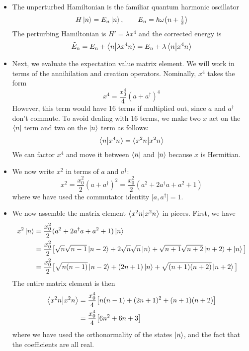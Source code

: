 \documentclass[11pt, a4paper]{article}
\renewcommand{\t}[1]{\tilde{#1}}
\begin{document}
\begin{itemize}
	
	\item The unperturbed Hamiltonian is the familiar quantum harmonic oscillator
	\begin{equation*}
		H \ket{n} = E_{n} \ket{n}, \qquad E_{n} = \hbar \omega \big(n + \tfrac{1}{2}\big)
	\end{equation*}
	The perturbing Hamiltonian is $ H' = \lambda x^{4} $ and the corrected energy is
	\begin{equation*}
		\t{E}_{n} = E_{n} + \braket{n}{\lambda x^{4} n} = E_{n} + \lambda \braket{n}{x^{4}n}
	\end{equation*}
	
	\item Next, we evaluate the expectation value matrix element. We will work in terms of the annihilation and creation operators. Nominally, $ x^{4} $ takes the form
	\begin{equation*}
		x^{4} = \frac{x_{0}^{4}}{4}(a+a^{\dagger})^{4} 
	\end{equation*}
	However, this term would have 16 terms if multiplied out, since $ a $ and $ a^{\dagger} $ don't commute. To avoid dealing with 16 terms, we make two $ x $ act on the $ \bra{n} $ term and two on the $ \ket{n} $ term as follows:
	\begin{equation*}
		\braket{n}{x^{4}n} = \braket{x^{2}n}{x^{2}n}
	\end{equation*}
	We can factor $ x^{4} $ and move it between $ \bra{n} $ and $ \ket{n} $ because $ x $ is Hermitian.
	
	\item We now write $ x^{2} $ in terms of $ a $ and $ a^{\dagger} $:
	\begin{equation*}
		x^{2} = \frac{x_{0}^{2}}{2}(a+a^{\dagger})^{2} = \frac{x_{0}^{2}}{2}(a^{2} + 2a^{\dagger}a + a^{2} + 1)
	\end{equation*}
	where we have used the commutator identity $ \big[a, a^{\dagger}\big] = 1 $.
	
	\item We now assemble the matrix element $ \braket{x^{2}n}{x^{2}n} $ in pieces. First, we have
	\begin{align*}
		x^{2} \ket{n} &= \frac{x_{0}^{2}}{2}(a^{2} + 2a^{\dagger}a + a^{2} + 1)\ket{n} \\
		&= \frac{x_{0}^{2}}{2}\big[\sqrt{n}\sqrt{n-1}\ket{n-2} + 2\sqrt{n}\sqrt{n}\ket{n} + \sqrt{n+1}\sqrt{n+2}\ket{n+2} + \ket{n}\big]\\
		& = \frac{x_{0}^{2}}{2}\big[\sqrt{n(n-1)}\ket{n-2}+(2n+1)\ket{n}+\sqrt{(n+1)(n+2)}\ket{n+2}\big]
	\end{align*}
	The entire matrix element is then
	\begin{align*}
		\braket{x^{2}n}{x^{2}n} &= \frac{x_{0}^{4}}{4}\big[n(n-1) + (2n+1)^{2} + (n+1)(n+2)\big]\\
		&= \frac{x_{0}^{4}}{4}\big[6n^{2} + 6n + 3\big]
	\end{align*}
	where we have used the orthonormality of the states $ \ket{n} $, and the fact that the coefficients are all real.
	

\end{itemize}
\end{document}
